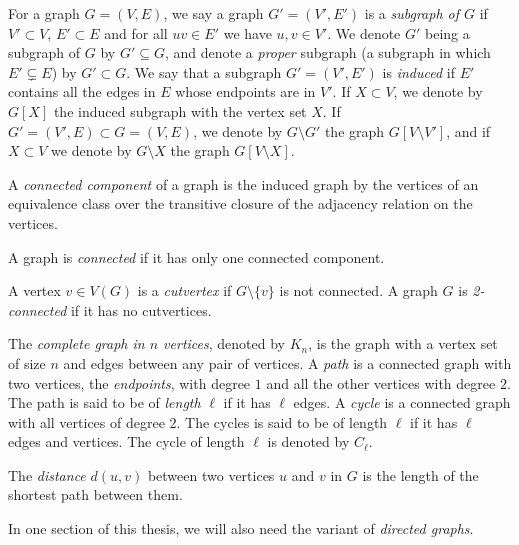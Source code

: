 \begin{definition}
	For a graph $G = (V, E)$, we say a graph $G' = (V', E')$ is a \emph{subgraph of $G$}
	 if $V' \subset V$, $E' \subset E$ and for all  $uv \in E'$ we have $u, v \in V'$. 
	 We denote $G'$ being a subgraph of $G$ by $G' \subseteq G$, and denote a \emph{proper}
	 subgraph (a subgraph in which $E' \subsetneq E$) by $G' \subset G$. 
	 We say that a subgraph $G' = (V', E')$ is \emph{induced} if $E'$ contains all the edges
	 in $E$ whose endpoints are in $V'$. If $X \subset V$, we denote by $G[X]$ the induced
	 subgraph with the vertex set $X$. If $G' = (V', E) \subset G = (V, E)$, we denote by
	 $G \setminus G'$ the graph $G[V \setminus V']$, and if $X \subset V$ we denote by
	  $G \setminus X$
	 the graph $G[V \setminus X]$.
\end{definition}

\begin{definition}
	A \emph{connected component} of a graph is the induced graph by the vertices of an equivalence
	class over the transitive closure of the adjacency relation on the vertices. 
	
	A graph is \emph{connected} if it has only one connected component.
	
	A vertex $v \in V(G)$ is a \emph{cutvertex} if $G \setminus \{v\}$ is not connected.
	A graph $G$ is \emph{2-connected} if it has no cutvertices. 
\end{definition}

\begin{definition}
	The \emph{complete graph in $n$ vertices}, denoted by $K_n$, is the graph with a vertex set
	of size $n$ and edges between any pair of vertices. 
	A \emph{path} is a connected graph with two vertices, the \emph{endpoints}, with degree
	$1$ and all the other vertices with degree $2$. The path is said to be of \emph{length} $\ell$
	if it has $\ell$ edges. 
	A \emph{cycle} is a connected graph with all vertices of degree $2$. The cycles is said
	to be of length $\ell$ if it has $\ell$ edges and vertices. The cycle of length $\ell$ is
	denoted by $C_\ell$. 
\end{definition}

\begin{definition}
	The \emph{distance} $d(u, v)$ between two vertices $u$ and $v$ in $G$ is the length of the
	shortest path between them.
\end{definition}

In one section of this thesis, we will also need the variant of \emph{directed graphs}.


